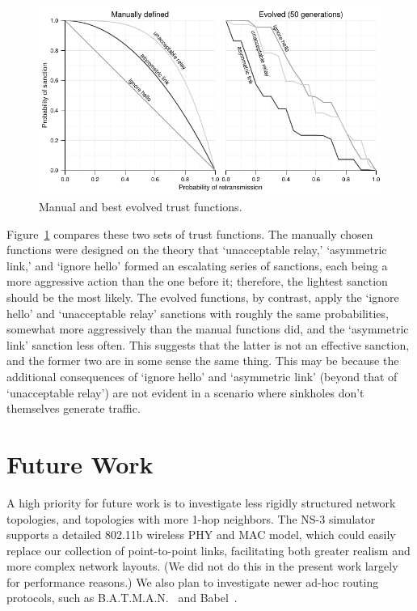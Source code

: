 \documentclass{article}
\begin{document}
\begin{figure}
\centering\includegraphics{figures/best-50g}
\caption{Manual and best evolved trust functions.}\label{f:tfopt}
\end{figure}

Figure~\ref{f:tfopt} compares these two sets of trust functions.  The
manually chosen functions were designed on the theory that
`unacceptable relay,' `asymmetric link,' and `ignore hello' formed an
escalating series of sanctions, each being a more aggressive action
than the one before it; therefore, the lightest sanction should be the
most likely.  The evolved functions, by contrast, apply the `ignore
hello' and `unacceptable relay' sanctions with roughly the same
probabilities, somewhat more aggressively than the manual functions
did, and the `asymmetric link' sanction less often.  This suggests
that the latter is not an effective sanction, and the former two are
in some sense the same thing.  This may be because the additional
consequences of `ignore hello' and `asymmetric link' (beyond that of
`unacceptable relay') are not evident in a scenario where sinkholes
don't themselves generate traffic.

\section{Future Work}

A high priority for future work is to investigate less rigidly
structured network topologies, and topologies with more 1-hop
neighbors.  The NS-3 simulator supports a detailed 802.11b wireless
PHY and MAC model, which could easily replace our collection of
point-to-point links, facilitating both greater realism and more
complex network layouts.  (We did not do this in the present work
largely for performance reasons.)  We also plan to investigate newer
ad-hoc routing protocols, such as B.A.T.M.A.N.~\cite{s-batman} and
Babel~\cite{s-babel}.
\end{document}
